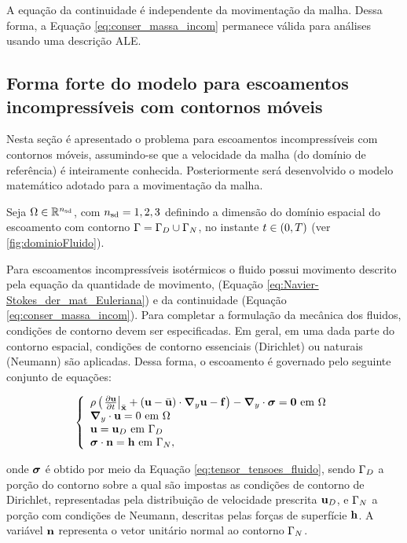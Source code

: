 A equação da continuidade é independente da movimentação da malha. Dessa forma, a Equação \eqref{eq:conser_massa_incom} permanece válida para análises usando uma descrição ALE.

\subsection{Forma forte do modelo para escoamentos incompressíveis com contornos móveis}

Nesta seção é apresentado o problema para escoamentos incompressíveis com contornos móveis, assumindo-se que a velocidade da malha (do domínio de referência) é inteiramente conhecida. Posteriormente será desenvolvido o modelo matemático adotado para a movimentação da malha.

Seja $\Omega \in \mathbb{R}^{{n_{\mathrm{sd}}}}$, com ${n_{\mathrm{sd}}} = 1,2,3$ definindo a dimensão do domínio espacial do escoamento com contorno $\Gamma = \Gamma_{D} \cup \Gamma_{N}$, no instante $t \in (0,T)$ (ver \autoref{fig:dominioFluido}).

Para escoamentos incompressíveis isotérmicos o fluido possui movimento descrito pela equação da quantidade de movimento, (Equação \eqref{eq:Navier-Stokes_der_mat_Euleriana}) e da continuidade (Equação \eqref{eq:conser_massa_incom}). Para completar a formulação da mecânica dos fluidos, condições de contorno devem ser especificadas. Em geral, em uma dada parte do contorno espacial, condições de contorno essenciais (Dirichlet) ou naturais (Neumann) são aplicadas. Dessa forma, o escoamento é governado pelo seguinte conjunto de equações:

\begin{equation}
	\left\{
	\begin{array}{l}
		\density\left( \left. \frac{\partial\velocity}{\partial t} \right|_{\posALE}  + \left(\velocity - \velocityALE \right)\cdot\gradient\velocity - \sbodyforce \right) - \divergence \cdot \stressTensor = \vzero  \ \textrm{em} \ \domain\\
		\divergence \cdot \velocity = 0  \ \textrm{em} \ \domain\\
		\velocity = \velocityD \ \textrm{em} \ \boundaryD \\
		\stressTensor \cdot \snormal = \surfaceLoad \ \textrm{em} \ \boundaryN,
	\end{array} \label{eq:conj_eq_DFC_ALE}
	\right.
\end{equation}

\noindent onde $\boldsymbol{\sigma}$ é obtido por meio da Equação \eqref{eq:tensor_tensoes_fluido}, sendo $\Gamma_{D}$ a porção do contorno sobre a qual são impostas as condições de contorno de Dirichlet, representadas pela distribuição de velocidade prescrita $\mathbf{u}_D$, e $\Gamma_{N}$ a porção com condições de Neumann, descritas pelas forças de superfície $\mathbf{h}$. A variável $\mathbf{n}$ representa o vetor unitário normal ao contorno $\Gamma_{N}$.

